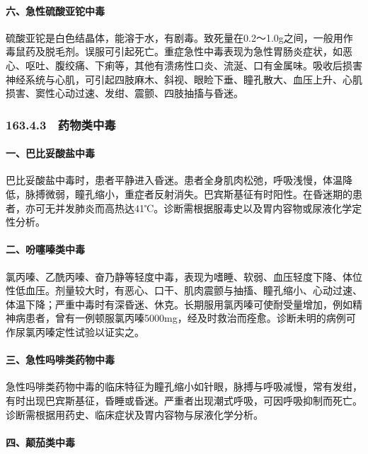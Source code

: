 \paragraph{六、急性硫酸亚铊中毒}

硫酸亚铊是白色结晶体，能溶于水，有剧毒。致死量在0.2～1.0g之间，一般用作毒鼠药及脱毛剂。误服可引起死亡。重症急性中毒表现为急性胃肠炎症状，如恶心、呕吐、腹绞痛、下痢等，其他有溃疡性口炎、流涎、口有金属味。吸收后损害神经系统与心肌，可引起四肢麻木、斜视、眼睑下垂、瞳孔散大、血压上升、心肌损害、窦性心动过速、发绀、震颤、四肢抽搐与昏迷。

\subsubsection{163.4.3　药物类中毒}

\paragraph{一、巴比妥酸盐中毒}

巴比妥酸盐中毒时，患者平静进入昏迷。患者全身肌肉松弛，呼吸浅慢，体温降低，脉搏微弱，瞳孔缩小，重症者反射消失。巴宾斯基征有时阳性。在昏迷期的患者，亦可无并发肺炎而高热达41℃。诊断需根据服毒史以及胃内容物或尿液化学定性分析。

\paragraph{二、吩噻嗪类中毒}

氯丙嗪、乙酰丙嗪、奋乃静等轻度中毒，表现为嗜睡、软弱、血压轻度下降、体位性低血压。剂量较大时，有恶心、口干、肌肉震颤与抽搐、瞳孔缩小、心动过速、体温下降；严重中毒时有深昏迷、休克。长期服用氯丙嗪可使耐受量增加，例如精神病患者，曾有一例顿服氯丙嗪5000mg，经及时救治而痊愈。诊断未明的病例可作尿氯丙嗪定性试验以证实之。

\paragraph{三、急性吗啡类药物中毒}

急性吗啡类药物中毒的临床特征为瞳孔缩小如针眼，脉搏与呼吸减慢，常有发绀，有时出现巴宾斯基征，昏睡或昏迷。严重者出现潮式呼吸，可因呼吸抑制而死亡。诊断需根据用药史、临床症状及胃内容物与尿液化学分析。

\paragraph{四、颠茄类中毒}


